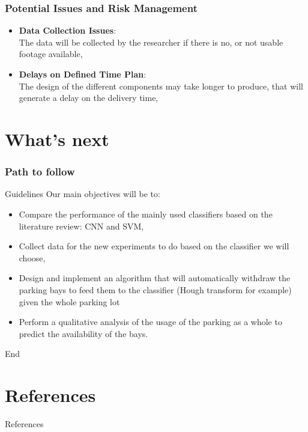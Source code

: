 \documentclass{beamer}
\begin{document}
\begin{frame}
\frametitle{Potential Issues and Risk Management}
\begin{itemize}
	\item \textbf{Data Collection Issues}:\\
	The data will be collected by the researcher if there is no, or not usable footage available,
	\item \textbf{Delays on Defined Time Plan}:\\
	The design of the different components may take longer to produce, that will generate a delay on the delivery time,
\end{itemize}
\end{frame}
\section{What's next}

\begin{frame}
\frametitle{Path to follow}
\begin{block}{Guidelines}
Our main objectives will be to:
\begin{itemize}
\item Compare the performance of the mainly used classifiers based on the literature review: CNN and SVM,
\item Collect data for the new experiments to do based on the classifier we will choose,
\item Design and implement an algorithm that will automatically withdraw the parking bays to feed them to the classifier (Hough transform for example) given the whole parking lot
\item Perform a qualitative analysis of the usage of the parking as a whole to predict the availability of the bays.

\end{itemize}

\end{block}
\end{frame}


\begin{frame}
\Huge{\centerline{End}}
\end{frame}


\section{References}
\begin{frame}[allowframebreaks]{References}%
\footnotesize{

}
\end{frame}
\end{document}
